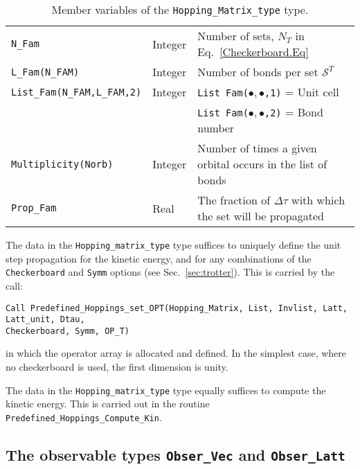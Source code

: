 \begin{table}[h]
\begin{center}
\begin{tabular}{@{} p{} @{} p{} p{} @{}}
			\texttt{N\_Fam}                &  Integer  &      Number of  sets, $N_T$ in Eq.~\eqref{Checkerboard.Eq}   \\
			\texttt{L\_Fam(N\_FAM)}  &  Integer &     Number of bonds per set $\mathcal{S}^{T}$ \\    
			\texttt{List\_Fam(N\_FAM,L\_FAM,2)}     &  Integer  &   \texttt{List Fam($ \bullet,\bullet $,1)} =  Unit cell \\
			&                        &          \texttt{List Fam($\bullet,\bullet$,2)} =   Bond number \\
			\texttt{Multiplicity(Norb)} & Integer           &        Number of  times a  given orbital  occurs in the list of bonds  \\
			\texttt{Prop\_Fam} &  Real            &         The fraction of $ \Delta \tau $   with which the set will be propagated   \                                
			\\\bottomrule
		\end{tabular}
		\caption{Member variables of the \texttt{Hopping\_Matrix\_type}  type.   
			\label{table:Hopping_matrix}}
	\end{center}
\end{table}

The  data in the \texttt{Hopping\_matrix\_type} type suffices to uniquely define the  unit step propagation for the kinetic energy, and for  any combinations of the  \texttt{Checkerboard} and  \texttt{Symm}  options (see Sec.~\ref{sec:trotter}).   This is carried  by the call: 
\begin{lstlisting}[style=fortran]
Call Predefined_Hoppings_set_OPT(Hopping_Matrix, List, Invlist, Latt, Latt_unit, Dtau,
Checkerboard, Symm, OP_T)
\end{lstlisting}
in which  the  operator   array     is  allocated and defined.    In the simplest  case, where no  checkerboard is  used, the  first dimension  is  unity. 

The   data in  the \texttt{Hopping\_matrix\_type} type   equally  suffices to compute  the kinetic energy.  This is carried out in the routine \texttt{Predefined\_Hoppings\_Compute\_Kin}.




\subsection{The observable types \texttt{Obser\_Vec} and \texttt{Obser\_Latt}}\label{sec:obs}

